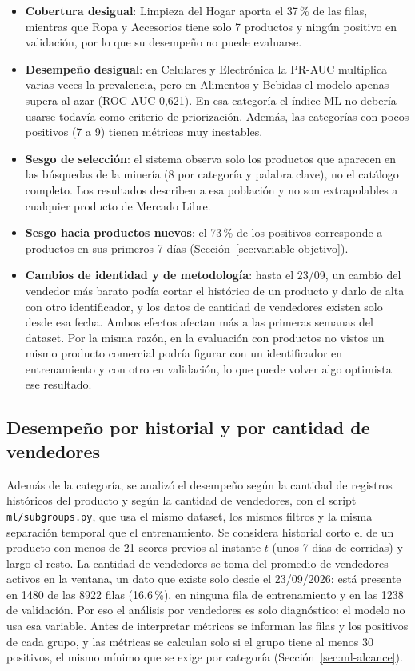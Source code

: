 \begin{itemize}
	\item \textbf{Cobertura desigual}: Limpieza del Hogar aporta el 37\,\% de las filas, mientras que Ropa y Accesorios tiene solo 7 productos y ningún positivo en validación, por lo que su desempeño no puede evaluarse.
	\item \textbf{Desempeño desigual}: en Celulares y Electrónica la PR-AUC multiplica varias veces la prevalencia, pero en Alimentos y Bebidas el modelo apenas supera al azar (ROC-AUC 0,621). En esa categoría el índice ML no debería usarse todavía como criterio de priorización. Además, las categorías con pocos positivos (7 a 9) tienen métricas muy inestables.
	\item \textbf{Sesgo de selección}: el sistema observa solo los productos que aparecen en las búsquedas de la minería (8 por categoría y palabra clave), no el catálogo completo. Los resultados describen a esa población y no son extrapolables a cualquier producto de Mercado Libre.
	\item \textbf{Sesgo hacia productos nuevos}: el 73\,\% de los positivos corresponde a productos en sus primeros 7 días (Sección~\ref{sec:variable-objetivo}).
	\item \textbf{Cambios de identidad y de metodología}: hasta el 23/09, un cambio del vendedor más barato podía cortar el histórico de un producto y darlo de alta con otro identificador, y los datos de cantidad de vendedores existen solo desde esa fecha. Ambos efectos afectan más a las primeras semanas del dataset. Por la misma razón, en la evaluación con productos no vistos un mismo producto comercial podría figurar con un identificador en entrenamiento y con otro en validación, lo que puede volver algo optimista ese resultado.
\end{itemize}

\subsection*{Desempeño por historial y por cantidad de vendedores}\label{sec:ml-subgrupos}

Además de la categoría, se analizó el desempeño según la cantidad de registros históricos del producto y según la cantidad de vendedores, con el script \texttt{ml/subgroups.py}, que usa el mismo dataset, los mismos filtros y la misma separación temporal que el entrenamiento. Se considera historial corto el de un producto con menos de 21 scores previos al instante $t$ (unos 7 días de corridas) y largo el resto. La cantidad de vendedores se toma del promedio de vendedores activos en la ventana, un dato que existe solo desde el 23/09/2026: está presente en 1480 de las 8922 filas (16,6\,\%), en ninguna fila de entrenamiento y en las 1238 de validación. Por eso el análisis por vendedores es solo diagnóstico: el modelo no usa esa variable. Antes de interpretar métricas se informan las filas y los positivos de cada grupo, y las métricas se calculan solo si el grupo tiene al menos 30 positivos, el mismo mínimo que se exige por categoría (Sección~\ref{sec:ml-alcance}).

